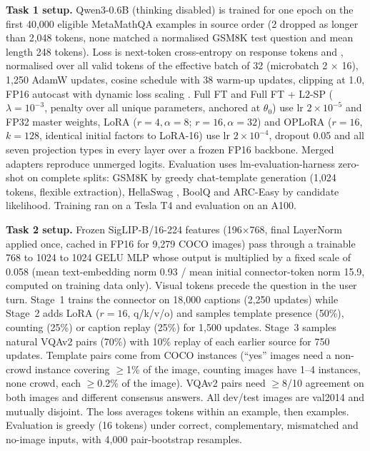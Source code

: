 \documentclass{article}
\begin{document}
\textbf{Task 1 setup.} Qwen3-0.6B \citep{yang2025qwen3} (thinking disabled) is trained for one epoch on the first 40{,}000 eligible MetaMathQA examples \citep{yu2024metamath} in source order (2 dropped as longer than 2{,}048 tokens, none matched a normalised GSM8K test question and mean length 248 tokens). Loss is next-token cross-entropy on response tokens and , normalised over all valid tokens of the effective batch of 32 (microbatch 2 $\times$ 16), 1{,}250 AdamW updates, cosine schedule with 38 warm-up updates, clipping at 1.0, FP16 autocast with dynamic loss scaling . Full FT and Full FT + L2-SP ($\lambda{=}10^{-3}$, penalty over all unique parameters, anchored at $\theta_0$) use lr $2{\times}10^{-5}$ and FP32 master weights, LoRA ($r{=}4,\alpha{=}8$; $r{=}16,\alpha{=}32$) and OPLoRA ($r{=}16$, $k{=}128$, identical initial factors to LoRA-16) use lr $2{\times}10^{-4}$, dropout 0.05 and all seven projection types in every layer over a frozen FP16 backbone.  Merged adapters reproduce unmerged logits. Evaluation uses lm-evaluation-harness \citep{gao2024lmeval} zero-shot on complete splits: GSM8K \citep{cobbe2021gsm8k} by greedy chat-template generation (1{,}024 tokens, flexible extraction), HellaSwag \citep{zellers2019hellaswag}, BoolQ \citep{clark2019boolq} and ARC-Easy \citep{clark2018arc} by candidate likelihood. Training ran on a Tesla T4 and evaluation on an A100.

\textbf{Task 2 setup.} Frozen SigLIP-B/16-224 \citep{zhai2023siglip} features (196$\times$768, final LayerNorm applied once, cached in FP16 for 9{,}279 COCO \citep{lin2014coco} images) pass through a trainable 768 to 1024 to 1024 GELU MLP whose output is multiplied by a fixed scale of 0.058 (mean text-embedding norm 0.93 / mean initial connector-token norm 15.9, computed on training data only). Visual tokens precede the question in the user turn. Stage~1 trains the connector on 18{,}000 captions (2{,}250 updates) while Stage~2 adds LoRA ($r{=}16$, q/k/v/o) and samples template presence (50\%), counting (25\%) or caption replay (25\%) for 1{,}500 updates. Stage~3 samples natural VQAv2 pairs (70\%) with 10\% replay of each earlier source for 750 updates. Template pairs come from COCO instances (``yes'' images need a non-crowd instance covering $\ge$1\% of the image, counting images have 1--4 instances, none crowd, each $\ge$0.2\% of the image). VQAv2 pairs need $\ge$8/10 agreement on both images and different consensus answers. All dev/test images are val2014 and mutually disjoint. The loss averages tokens within an example, then examples. Evaluation is greedy (16 tokens) under correct, complementary, mismatched and no-image inputs, with 4{,}000 pair-bootstrap resamples.
\end{document}
